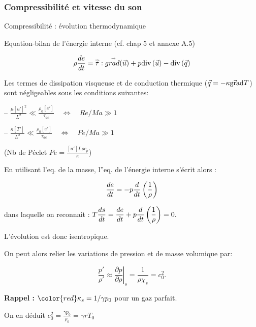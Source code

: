 \subsubsection{Compressibilité et vitesse du son}
\begin{frame}{Compressibilité : évolution thermodynamique}

\small

Equation-bilan de l'énergie interne (cf. chap 5  et annexe A.5)

\begin{equation}
		\rho \displaystyle \frac{d e}{dt} 
		= \accentset{\Rightarrow}{\tau} : \accentset{\Rightarrow}{grad}(\vec{u}) + 
		p \mbox{\rm div}\,( \vec{u})
		 - \mbox{\rm div}\,(\vec{q})
\end{equation}

Les termes de dissipation visqueuse et de conduction thermique ($\vec{q} = - \kappa \vec{\mbox{\rm gra}}\mbox{\rm d} T$) sont négligeables sous les conditions suivantes: 

-- $ \frac{\mu [u']^2}{L^2} \ll \frac{\rho_0 [e']}{\tau_{ac}} 
\quad \Longleftrightarrow \quad Re / Ma \gg 1$

-- $\frac{\kappa [T'] }{L^2} \ll \frac{\rho_0 [e']}{\tau_{ac}} \quad \Longleftrightarrow \quad Pe/Ma \gg 1$

(Nb de Péclet $Pe = \frac{[u'] L \rho c_p}{\kappa}$)

En utilisant l'eq. de la masse, l''eq. de l'énergie interne s'écrit alors :

$$
 \displaystyle \frac{d e}{dt}  =- p \displaystyle \frac{d }{dt}\left(\frac{1}{\rho}\right) 
$$

dans laquelle on reconnait :
$
T \displaystyle \frac{d s}{dt} = \displaystyle \frac{d e}{dt}  + p \displaystyle \frac{d }{dt}\left(\frac{1}{\rho}\right) =  0. 
$
 
 L'évolution est donc isentropique.
 
On peut alors relier les variations de pression et de masse volumique par:

\[
 \frac{p'}{\rho'} \approx  \left.\frac{\partial p}{\partial \rho}\right|_{\! s}  = \frac{1}{\rho \chi_s} = c_0^2.
\]


\medskip \pause
\textbf{Rappel :}  $\color{red} \kappa_s = 1/\gamma p_0$ pour un gaz parfait.

On en déduit $c_0^2 = \frac{\gamma p_0}{\rho_0} = \gamma r T_0 $


\vspace{0mm}

\end{frame}


